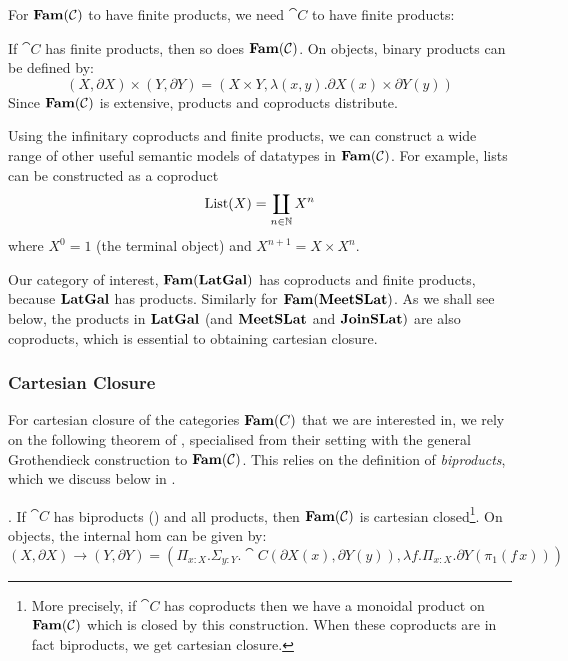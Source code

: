 For $\mathbf{Fam}(\mathcal{C})$ to have finite products, we need $\cat{C}$ to have
finite products:

\begin{proposition}
  If $\cat{C}$ has finite products, then so does $\mathbf{Fam}(\mathcal{C})$. On
  objects, binary products can be defined by:
  \begin{displaymath}
    (X, \partial X) \times (Y, \partial Y) = (X \times Y, \lambda (x, y). \partial X(x) \times \partial Y(y))
  \end{displaymath}
  Since $\mathbf{Fam}(\mathcal{C})$ is extensive, products and coproducts
  distribute.
\end{proposition}

Using the infinitary coproducts and finite products, we can construct
a wide range of other useful semantic models of datatypes in
$\mathbf{Fam}(\mathcal{C})$. For example, lists can be constructed as a coproduct
\begin{displaymath}
  \mathrm{List}(X) = \coprod_{n \in \mathbb{N}} X^n
\end{displaymath}
where $X^0 = 1$ (the terminal object) and $X^{n+1} = X \times X^n$.

Our category of interest, $\mathbf{Fam}(\mathbf{LatGal})$ has coproducts and finite
products, because $\mathbf{LatGal}$ has products. Similarly for
$\mathbf{Fam}(\mathbf{MeetSLat})$. As we shall see below, the products in $\mathbf{LatGal}$
(and $\mathbf{MeetSLat}$ and $\mathbf{JoinSLat})$ are also coproducts, which is
essential to obtaining cartesian closure.

\subsubsection{Cartesian Closure}

For cartesian closure of the categories $\mathbf{Fam}(C)$ that we are
interested in, we rely on the following theorem of \citet{nunes2023},
specialised from their setting with the general Grothendieck
construction to $\mathbf{Fam}(\mathcal{C})$. This relies on the definition of
\emph{biproducts}, which we discuss below in .

\begin{theorem}
  \label{thm:fam-closed}
  \AGDA.  If $\cat{C}$ has biproducts () and all
  products, then $\mathbf{Fam}(\mathcal{C})$ is cartesian closed\footnote{More
    precisely, if $\cat{C}$ has coproducts then we have a monoidal
    product on $\mathbf{Fam}(\mathcal{C})$ which is closed by this
    construction. When these coproducts are in fact biproducts, we get
    cartesian closure.}. On objects, the internal hom can be given by:
  \begin{displaymath}
    (X, \partial X) \to (Y, \partial Y) = (\Pi_{x : X}. \Sigma_{y : Y}. \cat{C}(\partial X(x), \partial Y(y)), \lambda f. \Pi_{x : X}. \partial Y(\pi_1(f\, x)))
  \end{displaymath}
\end{theorem}

